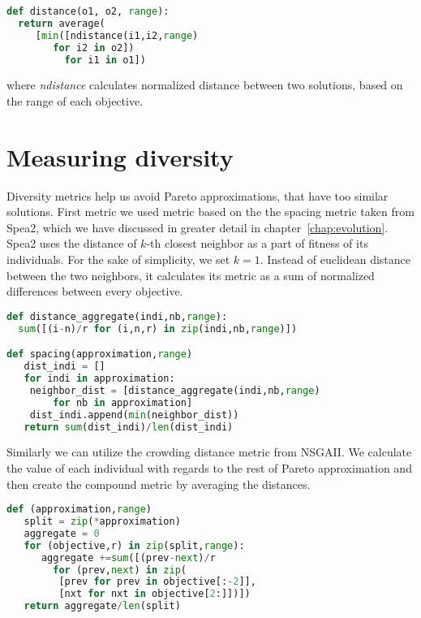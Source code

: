 \documentclass[12pt,oneside]{fithesis2}
\begin{document}
\begin{lstlisting}[language=Python,label=eps_example,caption=Distance indicator implementation]
def distance(o1, o2, range):
  return average(
     [min([ndistance(i1,i2,range) 
        for i2 in o2])
          for i1 in o1])
\end{lstlisting}

where \emph{ndistance} calculates normalized distance between two solutions, based on the range of each objective.

\section{Measuring diversity}
Diversity metrics help us avoid Pareto approximations, that have too similar solutions. First metric we used metric based on the the spacing metric taken from Spea2, which we have discussed in greater detail in chapter~\ref{chap:evolution}. Spea2 uses the distance of $k$-th closest neighbor as a part of fitness of its individuals. For the sake of simplicity, we set $k=1$. Instead of euclidean distance between the two neighbors, it calculates its metric as a sum of normalized differences between every objective. 

\begin{lstlisting}[language=Python,label=space_example,caption=Spacing indicator implementation]
def distance_aggregate(indi,nb,range):
  sum([(i-n)/r for (i,n,r) in zip(indi,nb,range)])

def spacing(approximation,range)
   dist_indi = []
   for indi in approximation:
	neighbor_dist = [distance_aggregate(indi,nb,range) 
		for nb in approximation]
	dist_indi.append(min(neighbor_dist))
   return sum(dist_indi)/len(dist_indi)
\end{lstlisting}

Similarly we can utilize the crowding distance metric from NSGAII. We calculate the value of each individual with regards to the rest of Pareto approximation and then create the compound metric by averaging the distances.

\begin{lstlisting}[language=Python,label=space_example,caption=Spacing indicator implementation]
def (approximation,range)
   split = zip(*approximation)
   aggregate = 0
   for (objective,r) in zip(split,range):
      aggregate +=sum([(prev-next)/r 
        for (prev,next) in zip(
         [prev for prev in objective[:-2]],
         [nxt for nxt in objective[2:]])])
   return aggregate/len(split)
\end{lstlisting}
\end{document}
